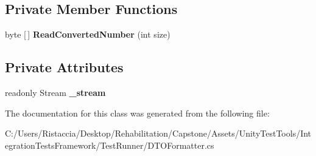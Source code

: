 \subsection*{Private Member Functions}
\begin{DoxyCompactItemize}
\item 
\mbox{\label{class_unity_test_1_1_d_t_o_formatter_1_1_reader_a0ae6b34dc9bda9f61630fb03c6638788}} 
byte \mbox{[}$\,$\mbox{]} {\bfseries Read\+Converted\+Number} (int size)
\end{DoxyCompactItemize}
\subsection*{Private Attributes}
\begin{DoxyCompactItemize}
\item 
\mbox{\label{class_unity_test_1_1_d_t_o_formatter_1_1_reader_a46232db7a887099df07e4ffec9028127}} 
readonly Stream {\bfseries \+\_\+stream}
\end{DoxyCompactItemize}


The documentation for this class was generated from the following file\+:\begin{DoxyCompactItemize}
\item 
C\+:/\+Users/\+Ristaccia/\+Desktop/\+Rehabilitation/\+Capstone/\+Assets/\+Unity\+Test\+Tools/\+Integration\+Tests\+Framework/\+Test\+Runner/D\+T\+O\+Formatter.\+cs\end{DoxyCompactItemize}
